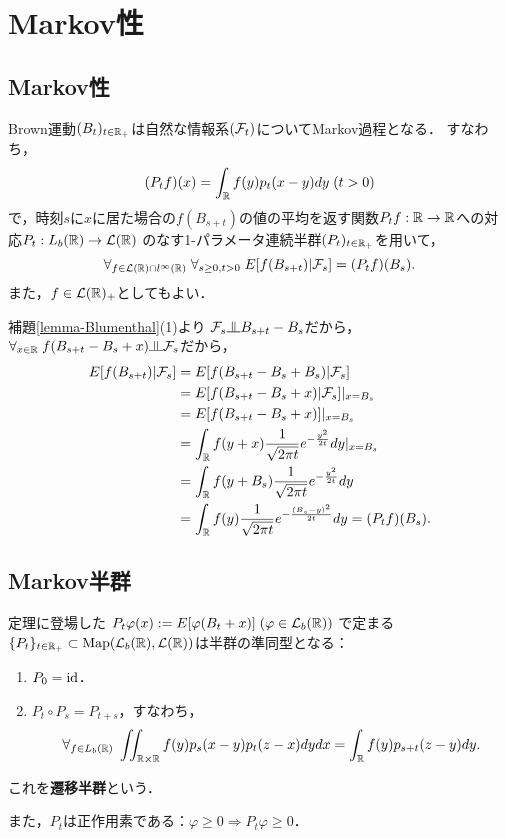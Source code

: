 \documentclass[uplatex,dvipdfmx]{jsreport}
\begin{document}
\section{Markov性}

\subsection{Markov性}

\begin{theorem}
    Brown運動$(B_t)_{t\in\mathbb{R}_+}$は自然な情報系$(\mathcal{F}_t)$についてMarkov過程となる．
    すなわち，
    \[(P_tf)(x)=\int_{\mathbb{R}} f(y)p_t(x-y)dy\;(t>0)\]
    で，時刻$s$に$x$に居た場合の$f(B_{s+t})$の値の平均を返す関数$P_tf:\mathbb{R}\to\mathbb{R}$への対応$P_t:L_b(\mathbb{R})\to\mathcal{L}(\mathbb{R})$
    のなす1-パラメータ連続半群$(P_t)_{t\in\mathbb{R}_+}$を用いて，
    \[\forall_{f\in\mathcal{L}(\mathbb{R})\cap l^\infty(\mathbb{R})}\;\forall_{s\ge0,t>0}\;E[f(B_{s+t})|\mathcal{F}_s]=(P_tf)(B_s).\]
    また，$f\in\mathcal{L}(\mathbb{R})_+$としてもよい．
\end{theorem}
\begin{Proof}
    補題\ref{lemma-Blumenthal}(1)より
    $\F_s\indep B_{s+t}-B_s$だから，$\forall_{x\in\R}\;f(B_{s+t}-B_s+x)\indep\F_s$だから，
    \begin{align*}
        E[f(B_{s+t})|\mathcal{F}_s]&=E[f(B_{s+t}-B_s+B_s)|\mathcal{F}_s]\\
        &=E[f(B_{s+t}-B_s+x)|\mathcal{F}_s]|_{x=B_s}\\
        &=E[f(B_{s+t}-B_s+x)]|_{x=B_s}\\
        &=\int_{\mathbb{R}} f(y+x)\frac{1}{\sqrt{2\pi t}}e^{-\frac{y^2}{2t}}dy|_{x=B_s}\\
        &=\int_{\mathbb{R}} f(y+B_s)\frac{1}{\sqrt{2\pi t}}e^{-\frac{y^2}{2t}}dy\\
        &=\int_{\mathbb{R}} f(y)\frac{1}{\sqrt{2\pi t}}e^{-\frac{(B_s-y)^2}{2t}}dy=(P_tf)(B_s).
    \end{align*}
\end{Proof}

\subsection{Markov半群}

\begin{definition}
    定理に登場した
    $P_t\varphi(x):=E[\varphi(B_t+x)]\;(\varphi\in \mathcal{L}_b(\mathbb{R}))$
    で定まる$\{P_t\}_{t\in\mathbb{R}_+}\subset\mathrm{Map}(\mathcal{L}_b(\mathbb{R}),\mathcal{L}(\mathbb{R}))$は半群の準同型となる：
    \begin{enumerate}
        \item $P_0=\mathrm{id}$．
        \item $P_t\circ P_s=P_{t+s}$，すなわち，
        \[\forall_{f\in L_b(\mathbb{R})}\;\iint_{\mathbb{R}\times\mathbb{R}} f(y)p_s(x-y)p_t(z-x)dydx=\int_{\mathbb{R}} f(y)p_{s+t}(z-y)dy.\]
    \end{enumerate}
    これを\textbf{遷移半群}という．
    
    また，$P_t$は正作用素である：$\varphi\ge0\Rightarrow P_t\varphi\ge0$．
\end{definition}
\end{document}
